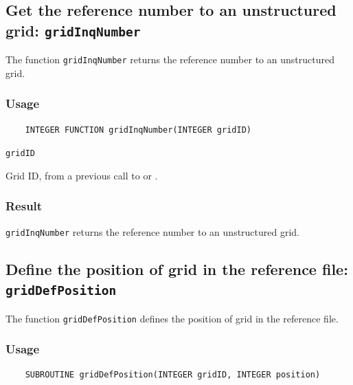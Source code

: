 \subsection{Get the reference number to an unstructured grid: \texttt{gridInqNumber}}
\label{gridInqNumber}

The function {\texttt{gridInqNumber}} returns the reference number to an unstructured grid.

\subsubsection*{Usage}

\begin{verbatim}
    INTEGER FUNCTION gridInqNumber(INTEGER gridID)
\end{verbatim}

\hspace*{4mm}\begin{minipage}[]{15cm}
\begin{deflist}{\texttt{gridID}\ }
\item[\texttt{gridID}]
Grid ID, from a previous call to {} or {}.

\end{deflist}
\end{minipage}

\subsubsection*{Result}

{\texttt{gridInqNumber}} returns the reference number to an unstructured grid.


\subsection{Define the position of grid in the reference file: \texttt{gridDefPosition}}
\label{gridDefPosition}

The function {\texttt{gridDefPosition}} defines the position of grid in the reference file.

\subsubsection*{Usage}

\begin{verbatim}
    SUBROUTINE gridDefPosition(INTEGER gridID, INTEGER position)
\end{verbatim}

